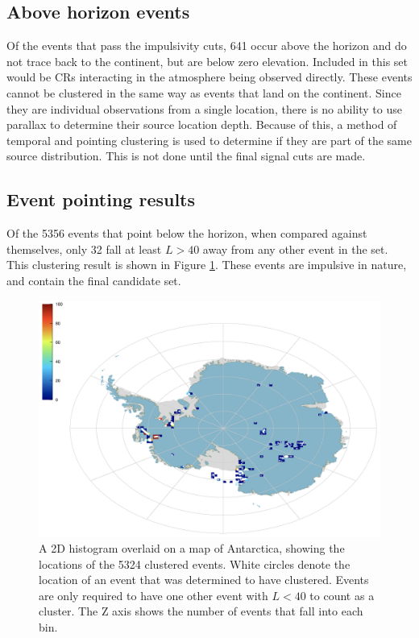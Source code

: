	
	\subsection{Above horizon events}
		Of the events that pass the impulsivity cuts, 641 occur above the horizon and do not trace back to the continent, but are below zero elevation.  Included in this set would be CRs interacting in the atmosphere being observed directly.  These events cannot be clustered in the same way as events that land on the continent.  Since they are individual observations from a single location, there is no ability to use parallax to determine their source location depth.  Because of this, a method of temporal and pointing clustering is used to determine if they are part of the same source distribution.  This is not done until the final signal cuts are made.
		

	\subsection{Event pointing results}
		Of the 5356 events that point below the horizon, when compared against themselves, only 32 fall at least $L>40$ away from any other event in the set. This clustering result is shown in Figure \ref{fig:clusteredImpulsives}.  These events are impulsive in nature, and contain the final candidate set.
		
		\begin{figure}
			\centering
				\includegraphics[width=\textwidth]{figures/clusteredImpulsives}
				\caption{A 2D histogram overlaid on a map of Antarctica, showing the locations of the 5324 clustered events.  White circles denote the location of an event that was determined to have clustered.  Events are only required to have one other event with $L<40$ to count as a cluster.  The Z axis shows the number of events that fall into each bin.} 
			\label{fig:clusteredImpulsives}
		\end{figure}	
	

